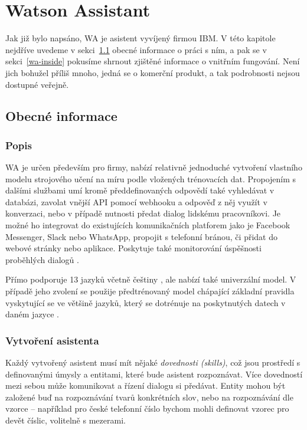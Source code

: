 \chapter{Watson Assistant}

Jak již bylo napsáno, WA je asistent vyvíjený firmou IBM.
V této kapitole nejdříve uvedeme v sekci~\ref{wa-common} obecné informace
o práci s ním, a pak se v sekci~\ref{wa-inside} pokusíme shrnout zjištěné
informace o vnitřním fungování.
Není jich bohužel příliš mnoho, jedná se o komerční produkt,
a tak podrobnosti nejsou dostupné veřejně.

\section{Obecné informace}\label{wa-common}

\subsection{Popis}

WA je určen především pro firmy, nabízí relativně jednoduché vytvoření
vlastního modelu strojového učení na míru podle vložených trénovacích
dat. Propojením s dalšími službami umí kromě předdefinovaných odpovědí
také vyhledávat v databázi, zavolat vnější API pomocí webhooku a odpověď
z něj využít v konverzaci, nebo v případě nutnosti předat dialog lidskému
pracovníkovi. Je možné ho integrovat do existujících komunikačních platforem
jako je Facebook Messenger, Slack nebo WhatsApp, propojit s telefonní
bránou, či přidat do webové stránky nebo aplikace. Poskytuje také monitorování
úspěšnosti proběhlých dialogů \citep{wa_about}.

Přímo podporuje 13 jazyků včetně
češtiny \citep{wa_languages}, ale nabízí také univerzální model. V případě
jeho zvolení se použije předtrénovaný model chápající základní pravidla
vyskytující se ve většině jazyků, který se dotrénuje na poskytnutých
datech v daném jazyce \citep{wa_universal_model}.

\subsection{Vytvoření asistenta}

Každý vytvořený asistent musí mít nějaké \textit{dovednosti (skills)},
což jsou prostředí s definovanými úmysly a entitami, které bude asistent
rozpoznávat. Více dovedností mezi sebou může komunikovat
a řízení dialogu si předávat. Entity mohou být založené buď na rozpoznávání tvarů
konkrétních slov, nebo na rozpoznávání dle vzorce -- například pro české telefonní
číslo bychom mohli definovat vzorec pro devět číslic, volitelně s mezerami.

